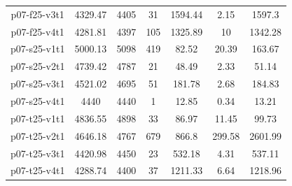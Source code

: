 \begin{table}[h!tbp]
\begin {tabular}[t]{|c|c|c|c|c|c|c|}
p07-f25-v3t1	&	4329.47	&	4405	&	31	&	1594.44	&	2.15	&	1597.3	\\
p07-f25-v4t1	&	4281.81	&	4397	&	105	&	1325.89	&	10	&	1342.28	\\
p07-s25-v1t1	&	5000.13	&	5098	&	419	&	82.52	&	20.39	&	163.67	\\
p07-s25-v2t1	&	4739.42	&	4787	&	21	&	48.49	&	2.33	&	51.14	\\
p07-s25-v3t1	&	4521.02	&	4695	&	51	&	181.78	&	2.68	&	184.83	\\
p07-s25-v4t1	&	4440	&	4440	&	1	&	12.85	&	0.34	&	13.21	\\
p07-t25-v1t1	&	4836.55	&	4898	&	33	&	86.97	&	11.45	&	99.73	\\
p07-t25-v2t1	&	4646.18	&	4767	&	679	&	866.8	&	299.58	&	2601.99	\\
p07-t25-v3t1	&	4420.98	&	4450	&	23	&	532.18	&	4.31	&	537.11	\\
p07-t25-v4t1	&	4288.74	&	4400	&	37	&	1211.33	&	6.64	&	1218.96	\\
\hline
\end{tabular}
\end{table} 


